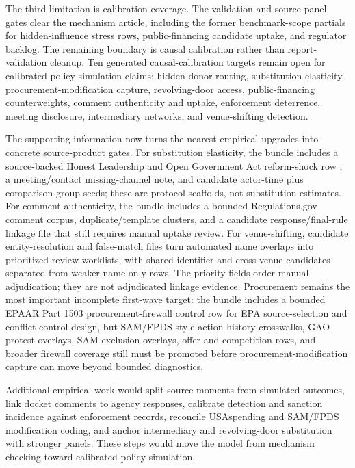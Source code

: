 The third limitation is calibration coverage. The validation and source-panel gates clear the mechanism article, including the former benchmark-scope partials for hidden-influence stress rows, public-financing candidate uptake, and regulator backlog. The remaining boundary is causal calibration rather than report-validation cleanup. Ten generated causal-calibration targets remain open for calibrated policy-simulation claims: hidden-donor routing, substitution elasticity, procurement-modification capture, revolving-door access, public-financing counterweights, comment authenticity and uptake, enforcement deterrence, meeting disclosure, intermediary networks, and venue-shifting detection.

The supporting information now turns the nearest empirical upgrades into concrete source-product gates. For substitution elasticity, the bundle includes a source-backed Honest Leadership and Open Government Act reform-shock row \citep{hloga2007}, a meeting/contact missing-channel note, and candidate actor-time plus comparison-group seeds; these are protocol scaffolds, not substitution estimates. For comment authenticity, the bundle includes a bounded Regulations.gov comment corpus, duplicate/template clusters, and a candidate response/final-rule linkage file that still requires manual uptake review. For venue-shifting, candidate entity-resolution and false-match files turn automated name overlaps into prioritized review worklists, with shared-identifier and cross-venue candidates separated from weaker name-only rows. The priority fields order manual adjudication; they are not adjudicated linkage evidence. Procurement remains the most important incomplete first-wave target: the bundle includes a bounded EPAAR Part 1503 procurement-firewall control row for EPA source-selection and conflict-control design, but SAM/FPDS-style action-history crosswalks, GAO protest overlays, SAM exclusion overlays, offer and competition rows, and broader firewall coverage still must be promoted before procurement-modification capture can move beyond bounded diagnostics.

Additional empirical work would split source moments from simulated outcomes, link docket comments to agency responses, calibrate detection and sanction incidence against enforcement records, reconcile USAspending and SAM/FPDS modification coding, and anchor intermediary and revolving-door substitution with stronger panels. These steps would move the model from mechanism checking toward calibrated policy simulation.

